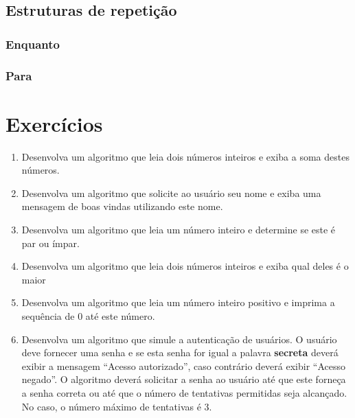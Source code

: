 \documentclass[11pt]{ifscarticle}
\begin{document}
\subsection{Estruturas de repetição}

\subsubsection{Enquanto}




\subsubsection{Para}




\section{Exercícios}

\begin{enumerate}
	\item Desenvolva um algoritmo	que leia dois números inteiros e exiba a soma destes números.
	\item Desenvolva um algoritmo que solicite ao usuário seu nome e exiba uma mensagem de boas vindas utilizando este nome.
	\item Desenvolva um algoritmo que leia um número inteiro e determine se este é par ou ímpar.
	\item Desenvolva um algoritmo que leia dois números inteiros e exiba qual deles é o maior 
	\item Desenvolva um algoritmo que leia um número inteiro positivo e imprima a sequência de 0 até este número. 		\item Desenvolva um algoritmo que simule a autenticação de usuários. O usuário deve fornecer uma senha e se esta senha for igual a palavra \textbf{secreta} deverá exibir a mensagem ``Acesso autorizado'', caso contrário deverá exibir ``Acesso negado''. O algoritmo deverá solicitar a senha ao usuário até que este forneça a senha correta ou até que o número de tentativas permitidas seja alcançado. No caso, o número máximo de tentativas é $3$.
\end{enumerate}


\vspace*{\fill}
\licenciamentoLivre
\end{document}
